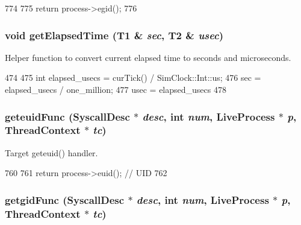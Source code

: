 \begin{DoxyCode}
774 {
775     return process->egid();
776 }
\end{DoxyCode}
\hypertarget{syscall__emul_8hh_ae0808df4f0ff1b8912037c856ee8d5f5}{
\subsubsection[{getElapsedTime}]{\setlength{\rightskip}{0pt plus 5cm}void getElapsedTime (T1 \& {\em sec}, \/  T2 \& {\em usec})}}
\label{syscall__emul_8hh_ae0808df4f0ff1b8912037c856ee8d5f5}
Helper function to convert current elapsed time to seconds and microseconds. 


\begin{DoxyCode}
474 {
475     int elapsed_usecs = curTick() / SimClock::Int::us;
476     sec = elapsed_usecs / one_million;
477     usec = elapsed_usecs %
478 }
\end{DoxyCode}
\hypertarget{syscall__emul_8hh_aff2ca2b37136cae14bf6677989f38a52}{
\subsubsection[{geteuidFunc}]{ geteuidFunc ({\bf SyscallDesc} $\ast$ {\em desc}, \/  int {\em num}, \/  {\bf LiveProcess} $\ast$ {\em p}, \/  {\bf ThreadContext} $\ast$ {\em tc})}}
\label{syscall__emul_8hh_aff2ca2b37136cae14bf6677989f38a52}


Target geteuid() handler. 


\begin{DoxyCode}
760 {
761     return process->euid();             // UID
762 }
\end{DoxyCode}
\hypertarget{syscall__emul_8hh_aada0d031ba405f7dd4846a72102aa413}{
\subsubsection[{getgidFunc}]{ getgidFunc ({\bf SyscallDesc} $\ast$ {\em desc}, \/  int {\em num}, \/  {\bf LiveProcess} $\ast$ {\em p}, \/  {\bf ThreadContext} $\ast$ {\em tc})}}
\label{syscall__emul_8hh_aada0d031ba405f7dd4846a72102aa413}


